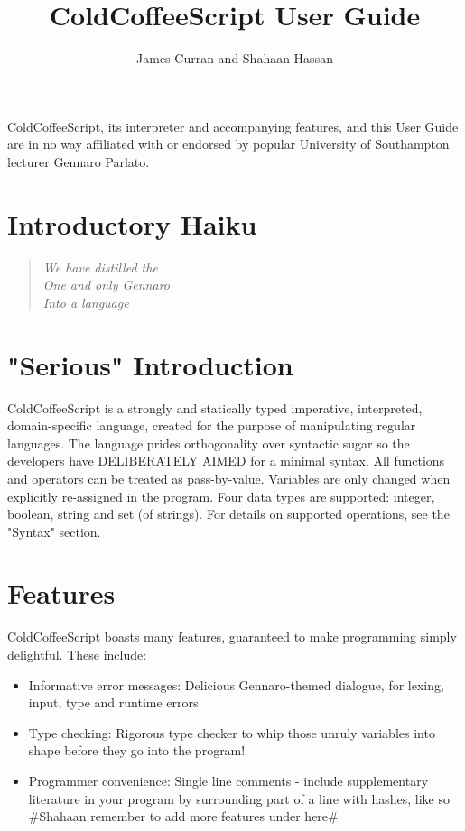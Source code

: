 \documentclass{article}
\author{James Curran and Shahaan Hassan}
\title{ColdCoffeeScript User Guide}
\begin{document}
\maketitle
ColdCoffeeScript, its interpreter and accompanying features, and this User Guide are in no way affiliated with or endorsed by popular University of Southampton lecturer Gennaro Parlato.  

\section{Introductory Haiku}

\begin{quote}
\textit{We have distilled the\\One and only Gennaro\\Into a language}
\end{quote}

\section{"Serious" Introduction}
ColdCoffeeScript is a strongly and statically typed imperative, interpreted, domain-specific language, created for the purpose of manipulating regular languages. The language prides orthogonality over syntactic sugar so the developers have DELIBERATELY AIMED for a minimal syntax. All functions and operators can be treated as pass-by-value. Variables are only changed when explicitly re-assigned in the program. Four data types are supported: integer, boolean, string and set (of strings). For details on supported operations, see the "Syntax" section.

\section{Features}
ColdCoffeeScript boasts many features, guaranteed to make programming simply delightful. These include:
\begin{itemize}
\item Informative error messages: Delicious Gennaro-themed dialogue, for lexing, input, type and runtime errors
\item Type checking: Rigorous type checker to whip those unruly variables into shape before they go into the program!
\item Programmer convenience: Single line comments - include supplementary literature in your program by surrounding part of a line with hashes, like so \#Shahaan remember to add more features under here\#
\end{itemize}
\end{document}
